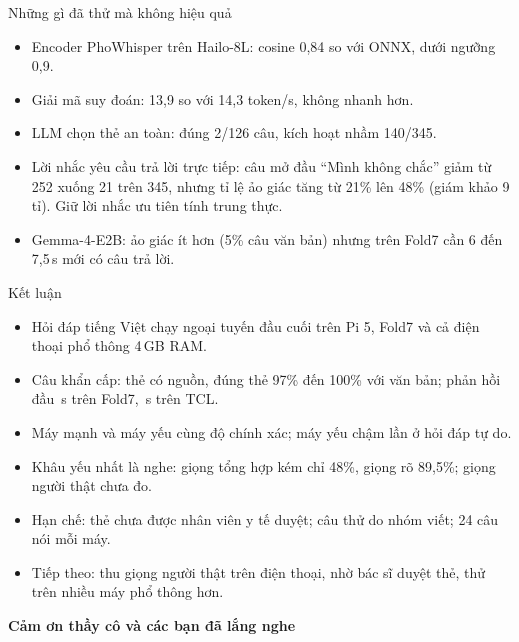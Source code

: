 \documentclass[aspectratio=169,11pt]{beamer}
\begin{document}
\begin{frame}{Những gì đã thử mà không hiệu quả}
\begin{itemize}
\item Encoder PhoWhisper trên Hailo-8L: cosine 0,84 so với ONNX, dưới ngưỡng 0,9.
\item Giải mã suy đoán: 13,9 so với 14,3 token/s, không nhanh hơn.
\item LLM chọn thẻ an toàn: đúng 2/126 câu, kích hoạt nhầm 140/345.
\item Lời nhắc yêu cầu trả lời trực tiếp: câu mở đầu ``Mình không chắc'' giảm từ 252 xuống 21 trên 345, nhưng tỉ lệ ảo giác tăng từ 21\% lên 48\% (giám khảo 9 tỉ). Giữ lời nhắc ưu tiên tính trung thực.
\item Gemma-4-E2B: ảo giác ít hơn (5\% câu văn bản) nhưng trên Fold7 cần 6 đến 7,5\,s mới có câu trả lời.
\end{itemize}
\end{frame}

\begin{frame}{Kết luận}
\begin{itemize}
\item Hỏi đáp tiếng Việt chạy ngoại tuyến đầu cuối trên Pi 5, Fold7 và cả điện thoại phổ thông 4\,GB RAM.
\item Câu khẩn cấp: thẻ có nguồn, đúng thẻ 97\% đến 100\% với văn bản; phản hồi đầu \hmSafeF\,s trên Fold7, \hmSafeT\,s trên TCL.
\item Máy mạnh và máy yếu cùng độ chính xác; máy yếu chậm \hmSpeedup{} lần ở hỏi đáp tự do.
\item Khâu yếu nhất là nghe: giọng tổng hợp kém chỉ 48\%, giọng rõ 89,5\%; giọng người thật chưa đo.
\item Hạn chế: thẻ chưa được nhân viên y tế duyệt; câu thử do nhóm viết; 24 câu nói mỗi máy.
\item Tiếp theo: thu giọng người thật trên điện thoại, nhờ bác sĩ duyệt thẻ, thử trên nhiều máy phổ thông hơn.
\end{itemize}
\vspace{10pt}
\begin{center}{\Large\bfseries\color{dam}Cảm ơn thầy cô và các bạn đã lắng nghe}\end{center}
\end{frame}
\end{document}
